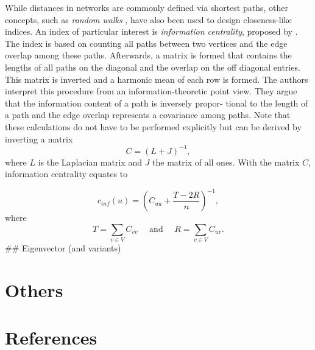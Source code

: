 \documentclass[]{book}
\theoremstyle{definition}
\theoremstyle{definition}
\theoremstyle{definition}
\theoremstyle{remark}
\begin{document}
While distances in networks are commonly defined via shortest paths,
other concepts, such as \emph{random walks} \citep{nr-rwcn-04}, have
also been used to design closeness-like indices. An index of particular
interest is \emph{information centrality}, proposed by
\citet{sz-rcme-89}. The index is based on counting all paths between two
vertices and the edge overlap among these paths. Afterwards, a matrix is
formed that contains the lengths of all paths on the diagonal and the
overlap on the off diagonal entries. This matrix is inverted and a
harmonic mean of each row is formed. The authors interpret this
procedure from an information-theoretic point view. They argue that the
information content of a path is inversely propor- tional to the length
of a path and the edge overlap represents a covariance among paths. Note
that these calculations do not have to be performed explicitly but can
be derived by inverting a matrix \[
C = ( L + J )^{−1},
\] where \(L\) is the Laplacian matrix and \(J\) the matrix of all ones.
With the matrix \(C\), information centrality equates to

\[
c_{inf}(u)=\left(C_{uu}+ \frac{T-2R}{n}\right)^{-1},
\] where \[
T=\sum\limits_{v \in V} C_{vv} \quad \text{ and } \quad R=\sum\limits_{v \in V} C_{uv}.
\] \#\# Eigenvector (and variants)

\hypertarget{others}{%
\section{Others}\label{others}}

\hypertarget{references}{%
\section*{References}\label{references}}


\end{document}
